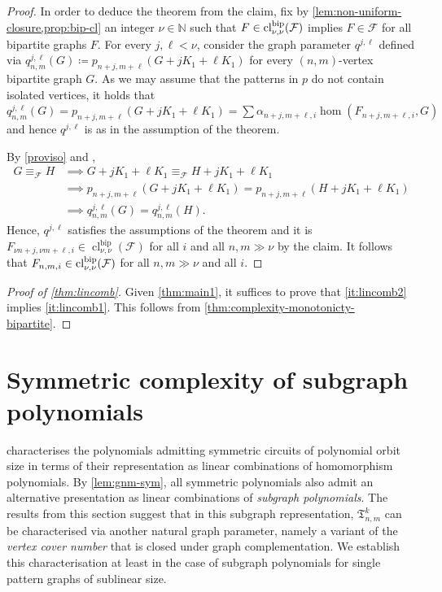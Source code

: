 \documentclass[11pt, DIV=15]{scrarticle}
\theoremstyle{definition}
\theoremstyle{plain}
\theoremstyle{remark}
\DeclareMathOperator{\cl}{cl}
\begin{document}
\begin{proof}
		In order to deduce the theorem from the claim,
		fix by \cref{lem:non-uniform-closure,prop:bip-cl} an integer $\nu \in \mathbb{N}$ such that $F \in \cl_{\nu,\nu}^{\textup{bip}}(\mathcal{F}) $ implies $F \in \mathcal{F}$
		for all bipartite graphs $F$.
		For every $j, \ell < \nu$,
		consider the graph parameter $q^{j, \ell}$
		defined via 
		$q_{n,m}^{j, \ell}(G) \coloneqq p_{n+j, m+\ell}(G +jK_1 + \ell K_1)$ for every $(n,m)$-vertex bipartite graph $G$.
		As we may assume that the patterns in $p$ do not contain isolated vertices, it holds that
		$q^{j, \ell}_{n, m}(G) = p_{n+j, m+\ell}(G + jK_1 + \ell K_1) = \sum \alpha_{n+j, m+\ell, i} \hom(F_{n+j, m+\ell,i}, G)$ 
		and hence $q^{j, \ell}$ is as in the assumption of the theorem.
		
		By \cref{proviso} and \cite[Theorem~7]{seppelt_logical_2024},
		\begin{align*}
			G \equiv_{\mathcal{F}} H
			&\implies G+jK_1 + \ell K_1 \equiv_{\mathcal{F}} H+ jK_1 + \ell K_1 \\
			&\implies p_{n+j, m+\ell}(G+jK_1 + \ell K_1) = p_{n+j, m+\ell}(H+jK_1+\ell K_1)\\
			&\implies q_{n,m}^{j, \ell}(G) = q_{n,m}^{j, \ell}(H).
		\end{align*}
		Hence, $q^{j,\ell}$ satisfies the assumptions of the theorem
		and it is $F_{\nu n +j, \nu m + \ell, i} \in \cl_{\nu, \nu}^{\text{bip}}(\mathcal{F})$ for all $i$ and
		all $n, m \gg \nu$ by the claim.
		It follows that $F_{n, m,i} \in \cl_{\nu, \nu}^{\textup{bip}}(\mathcal{F})$ for all $n,m \gg \nu$ and all $i$.
	\end{proof}

	\begin{proof}[Proof of \cref{thm:lincomb}]
		Given \cref{thm:main1},
		it suffices to prove that \ref{it:lincomb2} implies \ref{it:lincomb1}.
		This follows from \cref{thm:complexity-monotonicty-bipartite}.
	\end{proof}
	
	\section{Symmetric complexity of subgraph polynomials}
	
	
	 characterises the polynomials admitting symmetric circuits of polynomial orbit size in terms of their representation as linear combinations of homomorphism polynomials.
	By \cref{lem:gnm-sym}, all symmetric polynomials also admit an alternative presentation as linear combinations of \emph{subgraph polynomials}.
	The results from this section suggest that in this subgraph representation, $\mathfrak{T}^k_{n,m}$ can be characterised via another natural graph parameter, namely a variant of the \emph{vertex cover number} that is closed under graph complementation. 
	We establish this characterisation at least in the case of subgraph polynomials for single pattern graphs of sublinear size.
		
\end{document}
